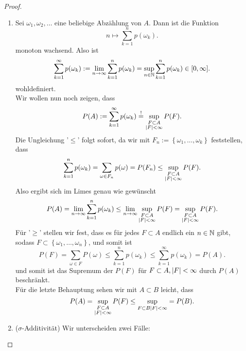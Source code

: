 \begin{proof}
    \begin{enumerate}[label=\protect\circled{\alph*}]
        \item Sei $\omega_1,\omega_2,\ldots$ eine beliebige Abzählung von $A$. Dann ist die Funktion
             \[
                 n \longmapsto \sum_{k=1}^n p(\omega_k)
            .\] 
            monoton wachsend. Also ist
            \[
                \sum_{k=1}^{\infty} p(\omega_k) := \lim_{n\to \infty}\sum_{k=1}^{n} p(\omega_k) = \sup_{n\in \N} \sum_{k=1}^n p(\omega_k) \in [0,\infty]
            .\]
            wohldefiniert. \\
            Wir wollen nun noch zeigen, dass 
            \[
                P(A) := \sum_{k=1}^{\infty} p(\omega_k) \stackrel{!}{=} \sup_{\substack{F\subset A \\ \lvert F\rvert <\infty} }P(F)
            .\] 
            Die Ungleichung '$\leq $' folgt sofort, da wir mit $F_n := \left \{\omega_1, \ldots, \omega_k\right\} $ feststellen, dass
            \[
                \sum_{k=1}^n p(\omega_k) = \sum_{\omega\in F_n} p(\omega) = P(F_n) \leq  \sup_{\substack{F\subset A \\ \lvert F\rvert <\infty} } P(F)
            .\] 
            Also ergibt sich im Limes genau wie gewünscht
            \[
                P(A) = \lim_{n\to \infty} \sum_{k=1}^n p(\omega_k) \leq  \lim_{n\to \infty} \sup_{\substack{F\subset A\\ \abs{F} <\infty} }P(F) = \sup_{\substack{F\subset A\\ \abs{F} <\infty} }P(F)
            .\] 
            Für '$\geq $' stellen wir fest, dass es für jedes $F\subset A$ endlich ein $n\in \mathbb{N}$ gibt, sodass $F\subset \left \{\omega_1,\ldots,\omega_n\right\} $, und somit ist
            \[
                P(F) = \sum_{\omega\in F} P(\omega) \leq  \sum_{k=1}^n p(\omega_k) \leq  \sum_{k=1}^{\infty} p(\omega_k) = P(A)
            .\] 
            und somit ist das Supremum der $P(F)$ für $F\subset A, \lvert F\rvert <\infty$ durch $P(A)$ beschränkt. \\
            Für die letzte Behauptung sehen wir mit $A\subset B$ leicht, dass
            \[
                P(A) = \sup_{\substack{F\subset A \\ \lvert F\rvert <\infty} } P(F) \leq  \sup_{F\subset B \\ \lvert F\rvert <\infty} = P(B)
            .\] 
        \item ($\sigma$-Additivität) Wir unterscheiden zwei Fälle:
            \begin{enumerate}[1)]

\end{enumerate}
\end{enumerate}
\end{proof}
